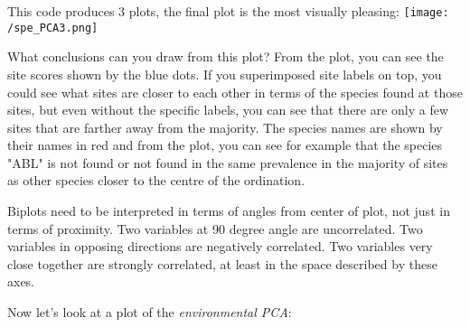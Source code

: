\documentclass[
]{book}
\begin{document}
This code produces 3 plots, the final plot is the most visually
pleasing: \texttt{[image: /spe\_PCA3.png]}

What conclusions can you draw from this plot? From the plot, you can see
the site scores shown by the blue dots. If you superimposed site labels
on top, you could see what sites are closer to each other in terms of
the species found at those sites, but even without the specific labels,
you can see that there are only a few sites that are farther away from
the majority. The species names are shown by their names in red and from
the plot, you can see for example that the species "ABL" is not found
or not found in the same prevalence in the majority of sites as other
species closer to the centre of the ordination.

Biplots need to be interpreted in terms of angles from center of plot,
not just in terms of proximity. Two variables at 90 degree angle are
uncorrelated. Two variables in opposing directions are negatively
correlated. Two variables very close together are strongly correlated,
at least in the space described by these axes.

Now let's look at a plot of the \emph{environmental PCA}:
\end{document}

